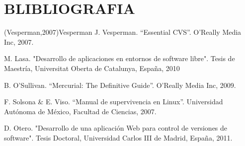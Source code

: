 \documentclass[a4paper,12pt]{article}
\begin{document}
{%



\section{BLIBLIOGRAFIA}




\begin{thebibliography}{9}





\bibitem(Vesperman,2007){Vesperman} J. Vesperman. “Essential CVS”. O’Really Media Inc,
2007.

 M. Lasa. "Desarrollo de aplicaciones en entornos de software libre". Tesis de Maestría, Universitat Oberta de Catalunya, España, 2010


 B. O’Sullivan. “Mercurial: The Definitive Guide”. O’Really
Media Inc, 2009.


 F. Solsona  \& E. Viso. “Manual de supervivencia en Linux”. Universidad Autónoma de México, Facultad de Ciencias, 2007.

 D. Otero. "Desarrollo de una aplicación Web para control de versiones de software". Tesis Doctoral,
Universidad Carlos III de Madrid, España, 2011.


\end{thebibliography}}
\end{document}
